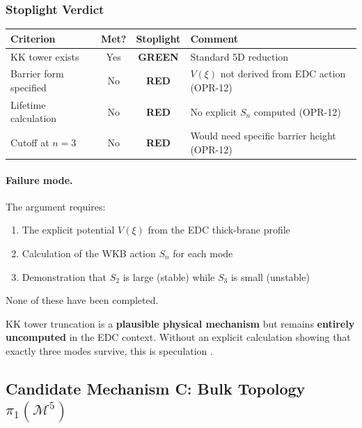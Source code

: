 \subsubsection{Stoplight Verdict}

\begin{center}
\small
\begin{tabular}{p{3cm}ccp{5cm}}
\toprule
\textbf{Criterion} & \textbf{Met?} & \textbf{Stoplight} & \textbf{Comment} \\
\midrule
KK tower exists & Yes & \textcolor{green!50!black}{\textbf{GREEN}} & Standard 5D reduction \tagBL{} \\
Barrier form specified & No & \textcolor{red!80!black}{\textbf{RED}} & $V(\xi)$ not derived from EDC action (OPR-12) \\
Lifetime calculation & No & \textcolor{red!80!black}{\textbf{RED}} & No explicit $S_n$ computed (OPR-12) \\
Cutoff at $n = 3$ & No & \textcolor{red!80!black}{\textbf{RED}} & Would need specific barrier height (OPR-12) \\
\bottomrule
\end{tabular}
\end{center}

\paragraph{Failure mode.}
The argument requires:
\begin{enumerate}[nosep]
    \item The explicit potential $V(\xi)$ from the EDC thick-brane profile
    \item Calculation of the WKB action $S_n$ for each mode
    \item Demonstration that $S_2$ is large (stable) while $S_3$ is small (unstable)
\end{enumerate}
None of these have been completed.

\begin{tcolorbox}[colback=red!5, colframe=red!50!black,
    title=\textbf{Mechanism B Verdict: RED}]
KK tower truncation is a \textbf{plausible physical mechanism} but remains
\textbf{entirely uncomputed} in the EDC context. Without an explicit calculation
showing that exactly three modes survive, this is speculation \tagP{}.
\end{tcolorbox}

\subsection{\texorpdfstring{Candidate Mechanism C: Bulk Topology $\pi_1(\mathcal{M}^5)$}{Candidate Mechanism C: Bulk Topology pi1(M5)}}
\label{sec:ch5_mechanism_c}

